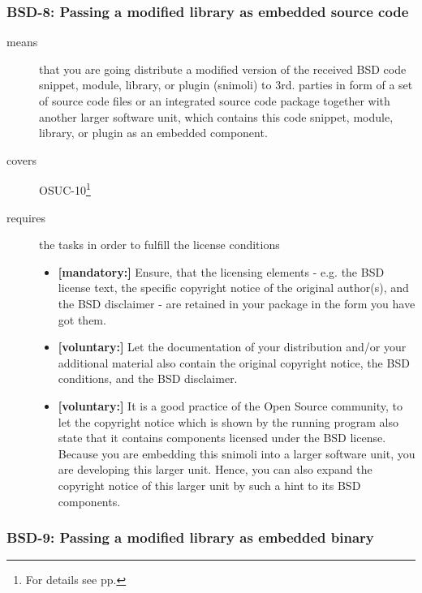 \subsubsection{BSD-8: Passing a modified library as embedded source code}
\label{OSUC-10-BSD}
\begin{description}
\item[means] that you are going distribute a modified version of the received
BSD code snippet, module, library, or plugin (snimoli) to 3rd. parties in form
of a set of source code files or an integrated source code package together with
another larger software unit, which contains this code snippet, module, library,
or plugin as an embedded component.
\item[covers] OSUC-10\footnote{For details see pp. \pageref{OSUC-10-DEF}}
\item[requires] the tasks in order to fulfill the license conditions
\begin{itemize}
  \item \textbf{[mandatory:]} Ensure, that the licensing elements - e.g.
  the BSD license text, the specific copyright notice of the original author(s),
  and the BSD disclaimer - are retained in your package in the form you have got
  them.
  \item \textbf{[voluntary:]} Let the documentation of your distribution
  and/or your additional material also contain the original copyright notice, the
  BSD conditions, and the BSD disclaimer.
 \item \textbf{[voluntary:]} It is a good practice of the Open Source
  community, to let the copyright notice which is shown by the running program
  also state that it contains components licensed under the BSD license. Because
  you are embedding this snimoli into a larger software unit, you are
  developing this larger unit. Hence, you can also expand the copyright notice
  of this larger unit by such a hint to its BSD components.
\end{itemize}
\end{description}


\subsubsection{BSD-9: Passing a modified library as embedded binary}

